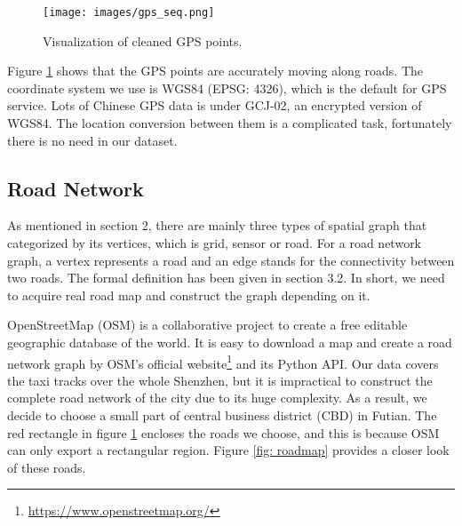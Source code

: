\begin{figure}[htb]
  \centering
  \texttt{[image: images/gps\_seq.png]}
  \caption{Visualization of cleaned GPS points.}
  \label{fig: gps_seq}
\end{figure}

Figure \ref{fig: gps_seq} shows that the GPS points are accurately moving along roads. The coordinate system we use is WGS84 (EPSG: 4326), which is the default for GPS service. Lots of Chinese GPS data is under GCJ-02, an encrypted version of WGS84. The location conversion between them is a complicated task, fortunately there is no need in our dataset.

\subsection{Road Network}
As mentioned in section 2, there are mainly three types of spatial graph that categorized by its vertices, which is grid, sensor or road. For a road network graph, a vertex represents a road and an edge stands for the connectivity between two roads. The formal definition has been given in section 3.2. In short, we need to acquire real road map and construct the graph depending on it.

OpenStreetMap (OSM)\cite{osm} is a collaborative project to create a free editable geographic database of the world. It is easy to download a map and create a road network graph by OSM's official website\footnote{\href{https://www.openstreetmap.org/}{https://www.openstreetmap.org/}} and its Python API. Our data covers the taxi tracks over the whole Shenzhen, but it is impractical to construct the complete road network of the city due to its huge complexity. As a result, we decide to choose a small part of central business district (CBD) in Futian. The red rectangle in figure \ref{fig: gps_seq} encloses the roads we choose, and this is because OSM can only export a rectangular region. Figure \ref{fig: roadmap} provides a closer look of these roads.

